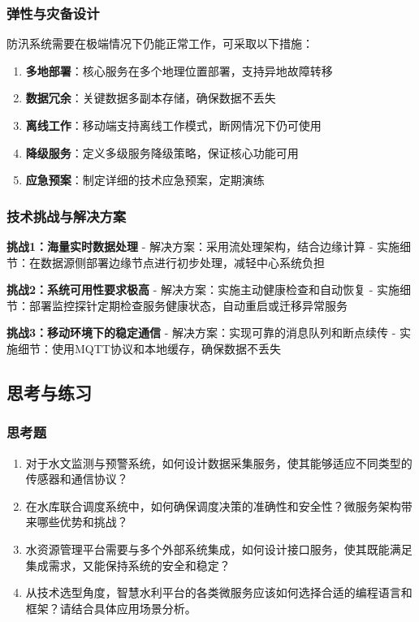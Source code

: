 \subsubsection{弹性与灾备设计}\label{ux5f39ux6027ux4e0eux707eux5907ux8bbeux8ba1}

防汛系统需要在极端情况下仍能正常工作，可采取以下措施：

\begin{enumerate}
\def\labelenumi{\arabic{enumi}.}
\tightlist
\item
  \textbf{多地部署}：核心服务在多个地理位置部署，支持异地故障转移
\item
  \textbf{数据冗余}：关键数据多副本存储，确保数据不丢失
\item
  \textbf{离线工作}：移动端支持离线工作模式，断网情况下仍可使用
\item
  \textbf{降级服务}：定义多级服务降级策略，保证核心功能可用
\item
  \textbf{应急预案}：制定详细的技术应急预案，定期演练
\end{enumerate}

\subsubsection{技术挑战与解决方案}\label{ux6280ux672fux6311ux6218ux4e0eux89e3ux51b3ux65b9ux6848-2}

\textbf{挑战1：海量实时数据处理} -
解决方案：采用流处理架构，结合边缘计算 -
实施细节：在数据源侧部署边缘节点进行初步处理，减轻中心系统负担

\textbf{挑战2：系统可用性要求极高} -
解决方案：实施主动健康检查和自动恢复 -
实施细节：部署监控探针定期检查服务健康状态，自动重启或迁移异常服务

\textbf{挑战3：移动环境下的稳定通信} -
解决方案：实现可靠的消息队列和断点续传 -
实施细节：使用MQTT协议和本地缓存，确保数据不丢失

\subsection{思考与练习}\label{ux601dux8003ux4e0eux7ec3ux4e60}

\subsubsection{思考题}\label{ux601dux8003ux9898}

\begin{enumerate}
\def\labelenumi{\arabic{enumi}.}
\item
  对于水文监测与预警系统，如何设计数据采集服务，使其能够适应不同类型的传感器和通信协议？
\item
  在水库联合调度系统中，如何确保调度决策的准确性和安全性？微服务架构带来哪些优势和挑战？
\item
  水资源管理平台需要与多个外部系统集成，如何设计接口服务，使其既能满足集成需求，又能保持系统的安全和稳定？
\item
  从技术选型角度，智慧水利平台的各类微服务应该如何选择合适的编程语言和框架？请结合具体应用场景分析。
\end{enumerate}

